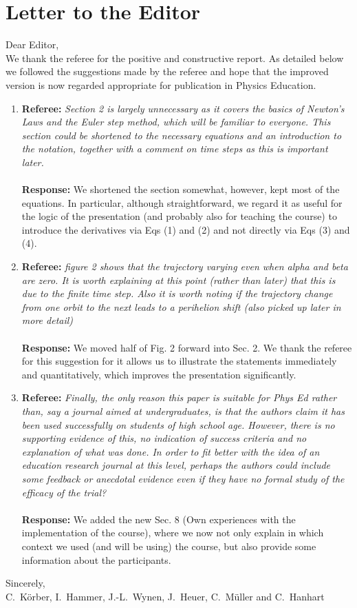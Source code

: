 \documentclass[prc,preprint,showpacs,showkeys,nofootinbib,tightenlines]{revtex4}
\begin{document}

\section*{Letter to the Editor}

\noindent
Dear Editor, \\

We thank the referee for the positive and constructive report.
As detailed below we followed the suggestions made by the referee and hope that the improved version is now regarded appropriate for publication in Physics Education.

\begin{enumerate}
\item \textbf{Referee:} 
\textit{
Section 2 is largely unnecessary as it covers the basics of Newton's Laws and the Euler step method, which will be familiar to everyone.
This section could be shortened to the necessary equations and an introduction to the notation, together with a comment on time steps as this is important later.
}
\\
\\
\textbf{Response:}
We shortened the section somewhat, however, kept most of the equations. In particular, although straightforward, we regard it as useful for the logic of the presentation (and probably also for teaching the course) to introduce the derivatives via Eqs (1) and (2) and not directly via Eqs (3) and (4).


\item \textbf{Referee:} 
\textit{
figure 2 shows that the trajectory varying even when alpha and beta are zero.
It is worth explaining at this point (rather than later) that this is due to the finite time step.
Also it is worth noting if the trajectory change from one orbit to the next leads to a perihelion shift (also picked up later in more detail)
}
\\
\\
\textbf{Response:}
We moved half of Fig. 2 forward into Sec. 2. We thank the referee for this suggestion for it allows us to illustrate the statements immediately and quantitatively, which improves the presentation significantly.


\item \textbf{Referee:} 
\textit{
Finally, the only reason this paper is suitable for Phys Ed rather than, say a journal aimed at undergraduates, is that the authors claim it has been used successfully on students of high school age.
However, there is no supporting evidence of this, no indication of success criteria and no explanation of what was done.
In order to fit better with the idea of an education research journal at this level, perhaps the authors could include some feedback or anecdotal evidence even if they have no formal study of the efficacy of the trial?
}
\\
\\
\textbf{Response:}
We added the new Sec. 8 (Own experiences with the implementation of the course), where we now not only explain in which context we used (and will be using) the course, but also provide some information about the participants.

\end{enumerate}

\noindent
Sincerely,\\

	C.~K\"orber,
	I.~Hammer,
	J.-L.~Wynen,
	J.~Heuer,
	C.~M\"uller and
	C.~Hanhart
\newpage
\end{document}
